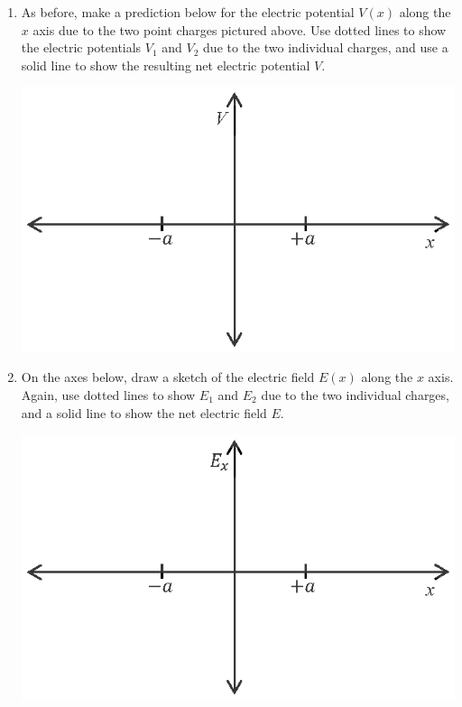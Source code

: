 \begin{enumerate}[wide, label=(\emph{\alph*})]

\item As before, make a prediction below for the electric potential $V(x)$ along the $x$ axis due to the two point charges pictured above.  Use dotted lines to show the electric potentials $V_1$ and $V_2$ due to the two individual charges, and use a solid line to show the resulting net electric potential $V$.  
\begin{center}
\includegraphics{potential_superposition/activity_2_3_figs/V_axes.eps}
\end{center}

\item On the axes below, draw a sketch of the electric field $E(x)$ along the $x$ axis.  Again, use dotted lines to show $E_1$ and $E_2$ due to the two individual charges, and a solid line to show the net electric field $E$.
\begin{center}
\includegraphics{potential_superposition/activity_2_3_figs/E_axes.eps}
\end{center}


\end{enumerate}
